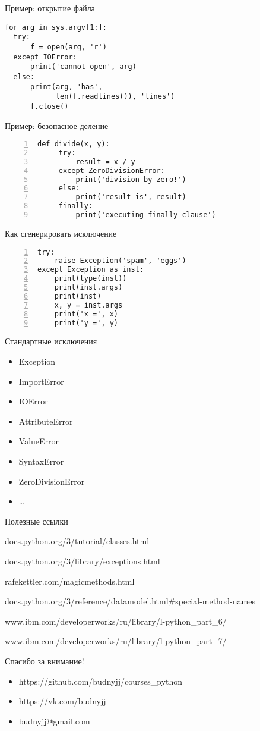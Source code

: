 \documentclass[hyperref={pdftex,unicode}]{beamer}
\begin{document}
\begin{frame}[fragile]{Пример: открытие файла}
  \begin{lstlisting}
for arg in sys.argv[1:]:
  try:
      f = open(arg, 'r')
  except IOError:
      print('cannot open', arg)
  else:
      print(arg, 'has',
            len(f.readlines()), 'lines')
      f.close()
  \end{lstlisting}
\end{frame}

\begin{frame}[fragile]{Пример: безопасное деление}
  \begin{lstlisting}[numbers=left]
def divide(x, y):
     try:
         result = x / y
     except ZeroDivisionError:
         print('division by zero!')
     else:
         print('result is', result)
     finally:
         print('executing finally clause')
  \end{lstlisting}
\end{frame}

\begin{frame}[fragile]{Как сгенерировать исключение}
  \begin{lstlisting}[numbers=left]
try:
    raise Exception('spam', 'eggs')
except Exception as inst:
    print(type(inst))
    print(inst.args)
    print(inst)
    x, y = inst.args
    print('x =', x)
    print('y =', y)
  \end{lstlisting}
\end{frame}

\begin{frame}[fragile]{Стандартные исключения}
  \begin{itemize}
  \item Exception
  \item ImportError
  \item IOError
  \item AttributeError
  \item ValueError
  \item SyntaxError
  \item ZeroDivisionError
  \item \dots
  \end{itemize}
\end{frame}

\begin{frame}{Полезные ссылки}
  \begin{itemize}
    \item docs.python.org/3/tutorial/classes.html
    \item docs.python.org/3/library/exceptions.html
    \item rafekettler.com/magicmethods.html
      \scriptsize{
      \item docs.python.org/3/reference/datamodel.html\#special-method-names
      \item www.ibm.com/developerworks/ru/library/l-python\_part\_6/
      \item www.ibm.com/developerworks/ru/library/l-python\_part\_7/
      }
  \end{itemize}
\end{frame}

\begin{frame}{Спасибо за внимание!}
  \begin{itemize}
  \item https://github.com/budnyjj/courses\_python
  \item https://vk.com/budnyjj
  \item budnyjj@gmail.com
  \end{itemize}
\end{frame}
\end{document}
